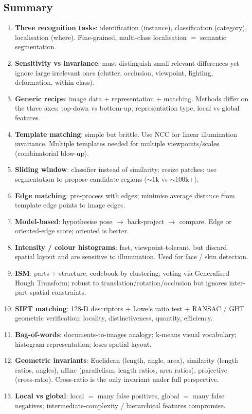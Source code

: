 \bigseparator

\subsection{Summary}

\begin{keybox}
\begin{enumerate}
  \item \textbf{Three recognition tasks}: identification (instance), classification (category), localisation (where). Fine-grained, multi-class localisation $=$ semantic segmentation.
  \item \textbf{Sensitivity vs invariance}: must distinguish small relevant differences yet ignore large irrelevant ones (clutter, occlusion, viewpoint, lighting, deformation, within-class).
  \item \textbf{Generic recipe}: image data $+$ representation $+$ matching. Methods differ on the three axes: top-down vs bottom-up, representation type, local vs global features.
  \item \textbf{Template matching}: simple but brittle. Use NCC for linear illumination invariance. Multiple templates needed for multiple viewpoints/scales (combinatorial blow-up).
  \item \textbf{Sliding window}: classifier instead of similarity; resize patches; use segmentation to propose candidate regions ($\sim$1k vs $\sim$100k+).
  \item \textbf{Edge matching}: pre-process with edges; minimise average distance from template edge points to image edges.
  \item \textbf{Model-based}: hypothesise pose $\to$ back-project $\to$ compare. Edge or oriented-edge score; oriented is better.
  \item \textbf{Intensity / colour histograms}: fast, viewpoint-tolerant, but discard spatial layout and are sensitive to illumination. Used for face / skin detection.
  \item \textbf{ISM}: parts $+$ structure; codebook by clustering; voting via Generalised Hough Transform; robust to translation/rotation/occlusion but ignores inter-part spatial constraints.
  \item \textbf{SIFT matching}: 128-D descriptors $+$ Lowe's ratio test $+$ RANSAC / GHT geometric verification; locality, distinctiveness, quantity, efficiency.
  \item \textbf{Bag-of-words}: documents-to-images analogy; k-means visual vocabulary; histogram representation; loses spatial layout.
  \item \textbf{Geometric invariants}: Euclidean (length, angle, area), similarity (length ratios, angles), affine (parallelism, length ratios, area ratios), projective (cross-ratio). Cross-ratio is the only invariant under full perspective.
  \item \textbf{Local vs global}: local $=$ many false positives, global $=$ many false negatives; intermediate-complexity / hierarchical features compromise.
\end{enumerate}
\end{keybox}

